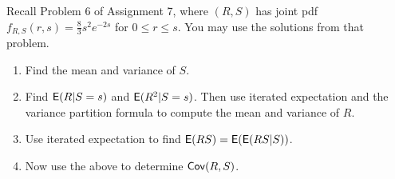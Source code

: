 \documentclass[12pt]{article}
\newcommand{\E}{{\sf E}}
\newcommand{\Cov}{{\sf Cov}}
\newenvironment{problem}[2][Problem]{\begin{trivlist}
\item[\hskip \labelsep {\bfseries #1}\hskip \labelsep {\bfseries #2.}]}
{\end{trivlist}}
\begin{document}
\begin{problem}{3}
  Recall Problem 6 of Assignment 7, where $(R, S)$ has joint 
  pdf $f_{R,S} (r, s) = \frac{8}{3} s^2 e^{-2s}$ for
  $0 \le r \le s$. You may use the solutions from that problem.
  \begin{enumerate}
    \item Find the mean and variance of $S$.
    \item Find $\E(R|S = s)$ and $\E(R^2|S = s)$. Then use iterated 
    expectation and the variance partition formula to compute the 
    mean and variance of $R$.
    \item Use iterated expectation to find $\E(RS) = \E(\E(RS|S))$.
    \item Now use the above to determine $\Cov(R, S)$.
  \end{enumerate}


\end{problem}
\end{document}
